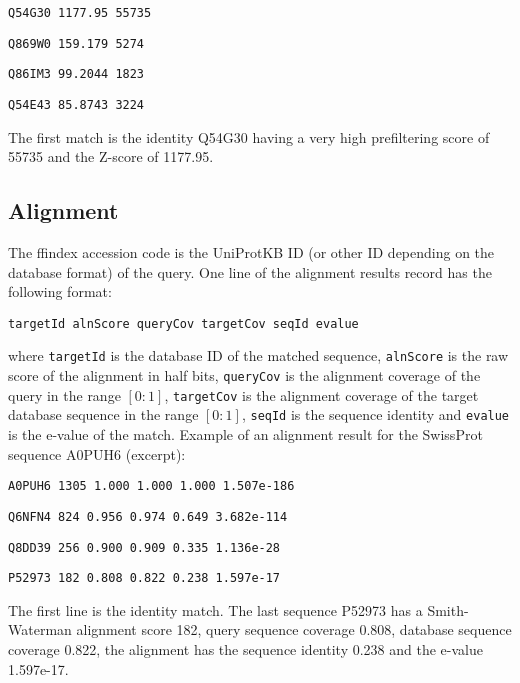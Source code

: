 \documentclass[11pt,a4paper]{report}
\begin{document}
\texttt{\footnotesize Q54G30 1177.95 55735}{\footnotesize \par}

\texttt{\footnotesize Q869W0 159.179 5274}{\footnotesize \par}

\texttt{\footnotesize Q86IM3 99.2044 1823}{\footnotesize \par}

\texttt{\footnotesize Q54E43 85.8743 3224}{\footnotesize \par}

The first match is the identity Q54G30 having a very high prefiltering
score of 55735 and the Z-score of 1177.95. 


\subsection{Alignment}

The ffindex accession code is the UniProtKB ID (or other ID depending
on the database format) of the query. One line of the alignment results
record has the following format:

\texttt{targetId alnScore queryCov targetCov seqId evalue}

where \texttt{targetId} is the database ID of the matched sequence,
\texttt{alnScore} is the raw score of the alignment in half bits,
\texttt{queryCov} is the alignment coverage of the query in the range
$[0:1]$, \texttt{targetCov} is the alignment coverage of the target
database sequence in the range $[0:1]$, \texttt{seqId} is the sequence
identity and \texttt{evalue} is the e-value of the match. Example
of an alignment result for the SwissProt sequence A0PUH6 (excerpt):

\texttt{\footnotesize A0PUH6 1305 1.000 1.000 1.000 1.507e-186}{\footnotesize \par}

\texttt{\footnotesize Q6NFN4 824 0.956 0.974 0.649 3.682e-114}{\footnotesize \par}

\texttt{\footnotesize Q8DD39 256 0.900 0.909 0.335 1.136e-28}{\footnotesize \par}

\texttt{\footnotesize P52973 182 0.808 0.822 0.238 1.597e-17}{\footnotesize \par}

The first line is the identity match. The last sequence P52973 has
a Smith-Waterman alignment score 182, query sequence coverage 0.808,
database sequence coverage 0.822, the alignment has the sequence identity
0.238 and the e-value 1.597e-17.
\end{document}
